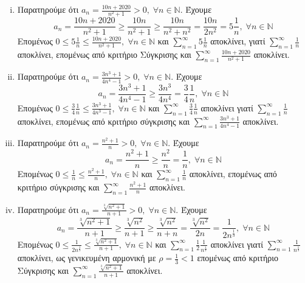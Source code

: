 \documentclass[a4paper,table]{report}
\begin{document}
\begin{enumerate}
\begin{enumerate}[i)]
      \item Παρατηρούμε ότι $ a_{n} = \frac{10n+2020}{n^{2}+1} > 0, \; 
        \forall n \in \mathbb{N} $. Έχουμε
        \[
          a_{n} = \frac{10n+2020}{n^{2}+1} \geq \frac{10n}{n^{2}+1} \geq 
          \frac{10n}{n^{2}+n^{2}} = \frac{10n}{2n^{2}} = 5 \frac{1}{n}, \; 
          \forall n \in \mathbb{N}
        \] 
        Επομένως $ 0 \leq 5 \frac{1}{n} \leq \frac{10n+2020}{n^{2}+1}, \; 
        \forall n \in \mathbb{N} $ και $ \sum_{n=1}^{\infty} 5 \frac{1}{n} $ 
        αποκλίνει, γιατί $ \sum_{n=1}^{\infty} \frac{1}{n} $ αποκλίνει, 
        επομένως από κριτήριο Σύγκρισης και $ \sum_{n=1}^{\infty} 
        \frac{10n +2020}{n^{2}+1} $ αποκλίνει.

      \item Παρατηρούμε ότι $ a_{n} = \frac{3n^{3}+1}{4n^{4}-1} > 0, \; \forall n 
        \in \mathbb{N} $. Έχουμε
        \[
          a_{n} = \frac{3n^{3}+1}{4n^{4}-1} \geq \frac{3n^{3}}{4n^{4}} = 
          \frac{3}{4} \frac{1}{n}, \; \forall n \in \mathbb{N} 
        \] 
        Επομένως $ 0 \leq \frac{3}{4} \frac{1}{n} \leq \frac{3n^{3}+1}{4n^{3}-1}, 
        \; \forall n \in \mathbb{N} $ και $ \sum_{n=1}^{\infty} \frac{3}{4} 
        \frac{1}{n} $ αποκλίνει γιατί $ \sum_{n=1}^{\infty} \frac{1}{n} $ 
        αποκλίνει, επομένως από κριτήριο σύγκρισης και $ \sum_{n=1}^{\infty} 
        \frac{3n^{3}+1}{4n^{4}-1} $ αποκλίνει.

      \item Παρατηρούμε ότι $ a_{n} = \frac{n^{2}+1}{n} > 0, \; \forall n 
        \in \mathbb{N} $. Έχουμε 
        \[
          a_{n} = \frac{n^{2}+1}{n} \geq \frac{n^{2}}{n} = \frac{1}{n}, \; 
          \forall n \in \mathbb{N}  
        \]
        Επομένως $ 0 \leq \frac{1}{n} \leq \frac{n^{2}+1}{n}, \; \forall n \in
        \mathbb{N}  $ και $ \sum_{n=1}^{\infty} \frac{1}{n} $ αποκλίνει, επομένως 
        από κριτήριο σύγκρισης και $ \sum_{n=1}^{\infty} \frac{n^{2}+1}{n} $ 
        αποκλίνει.

      \item Παρατηρούμε ότι $ a_{n} = \frac{\sqrt[3]{n^{2}+1}}{n+1} > 0, \; 
        \forall n \in \mathbb{N} $. Έχουμε
        \[
          a_{n} = \frac{\sqrt[3]{n^{2}+1}}{n+1} \geq \frac{\sqrt[3]{n^{2}}}{n+1} 
          \geq \frac{\sqrt[3]{n^{2}}}{n+n} = \frac{\sqrt[3]{n^{2}}}{2n} =
          \frac{1}{2n^{\frac{1}{3}}}, \; \forall n \in \mathbb{N}
        \] 
        Επομένως $ 0 \leq \frac{1}{2n^{\frac{1}{3}}} \leq 
        \frac{\sqrt[3]{n^{2}+1} }{n+1}, \; \forall n \in \mathbb{N} $ και 
        $ \sum_{n=1}^{\infty} \frac{1}{2} \frac{1}{n^{\frac{1}{3}}} $ 
        αποκλίνει γιατί $ \sum_{n=1}^{\infty} \frac{1}{n^{\frac{1}{3}}} $ 
        αποκλίνει, ως γενικευμένη αρμονική με $ \rho = \frac{1}{3} < 1 $ 
        επομένως από κριτήριο Σύγκρισης και $ \sum_{n=1}^{\infty} 
        \frac{\sqrt[3]{n^{2}+1}}{n+1} $ αποκλίνει.


\end{enumerate}
\end{enumerate}
\end{document}
